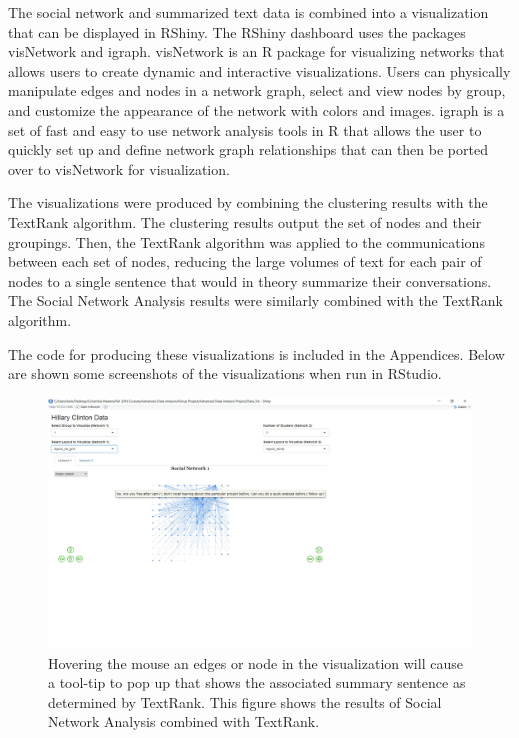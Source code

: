 The social network and summarized text data is combined into a visualization that can be displayed in RShiny. The RShiny dashboard uses the packages visNetwork and igraph. visNetwork is an R package for visualizing networks that allows users to create dynamic and interactive visualizations. Users can physically manipulate edges and nodes in a network graph, select and view nodes by group, and customize the appearance of the network with colors and images. igraph is a set of fast and easy to use network analysis tools in R that allows the user to quickly set up and define network graph relationships that can then be ported over to visNetwork for visualization.

The visualizations were produced by combining the clustering results with the TextRank algorithm.
The clustering results output the set of nodes and their groupings. Then, the TextRank algorithm was applied to the communications between each set of nodes, reducing the large volumes of text for each pair of nodes to a single sentence that would in theory summarize their conversations. The Social Network Analysis results were similarly combined with the TextRank algorithm.

The code for producing these visualizations is included in the Appendices. Below are shown some screenshots of the visualizations when run in RStudio.

\begin{figure}[h]
	\includegraphics[width=\textwidth]{eric/Viz_Screenshot_1}
	\caption{Hovering the mouse an edges or node in the visualization will cause a tool-tip to pop up that shows the associated summary sentence as determined by TextRank. This figure shows the results of Social Network Analysis combined with TextRank.}
	\label{Viz1}
\end{figure}

